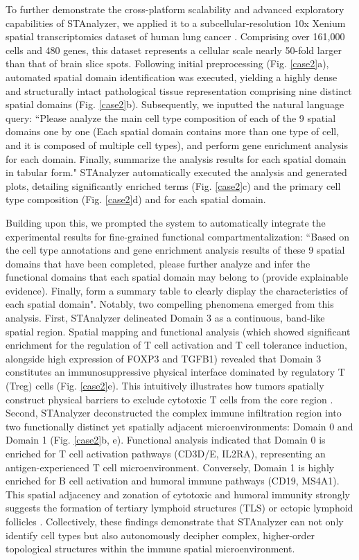 \documentclass[11pt,a4paper]{article}
\begin{document}
To further demonstrate the cross-platform scalability and advanced exploratory capabilities of STAnalyzer, we applied it to a subcellular-resolution 10x Xenium spatial transcriptomics dataset of human lung cancer \cite{janesick2023high,blampey2025novae}. Comprising over 161,000 cells and 480 genes, this dataset represents a cellular scale nearly 50-fold larger than that of brain slice spots. Following initial preprocessing (Fig. \ref{case2}a), automated spatial domain identification was executed, yielding a highly dense and structurally intact pathological tissue representation comprising nine distinct spatial domains (Fig. \ref{case2}b). Subsequently, we inputted the natural language query: ``Please analyze the main cell type composition of each of the 9 spatial domains one by one (Each spatial domain contains more than one type of cell, and it is composed of multiple cell types), and perform gene enrichment analysis for each domain. Finally, summarize the analysis results for each spatial domain in tabular form." STAnalyzer automatically executed the analysis and generated plots, detailing significantly enriched terms (Fig. \ref{case2}c) and the primary cell type composition (Fig. \ref{case2}d) and for each spatial domain.

Building upon this, we prompted the system to automatically integrate the experimental results for fine-grained functional compartmentalization: ``Based on the cell type annotations and gene enrichment analysis results of these 9 spatial domains that have been completed, please further analyze and infer the functional domains that each spatial domain may belong to (provide explainable evidence). Finally, form a summary table to clearly display the characteristics of each spatial domain". Notably, two compelling phenomena emerged from this analysis. First, STAnalyzer delineated Domain 3 as a continuous, band-like spatial region. Spatial mapping and functional analysis (which showed significant enrichment for the regulation of T cell activation and T cell tolerance induction, alongside high expression of FOXP3 and TGFB1) revealed that Domain 3 constitutes an immunosuppressive physical interface dominated by regulatory T (Treg) cells (Fig. \ref{case2}e). This intuitively illustrates how tumors spatially construct physical barriers to exclude cytotoxic T cells from the core region \cite{joyce2015t,schurch2020coordinated}. Second, STAnalyzer deconstructed the complex immune infiltration region into two functionally distinct yet spatially adjacent microenvironments: Domain 0 and Domain 1 (Fig. \ref{case2}b, e). Functional analysis indicated that Domain 0 is enriched for T cell activation pathways (CD3D/E, IL2RA), representing an antigen-experienced T cell microenvironment. Conversely, Domain 1 is highly enriched for B cell activation and humoral immune pathways (CD19, MS4A1). This spatial adjacency and zonation of cytotoxic and humoral immunity strongly suggests the formation of tertiary lymphoid structures (TLS) or ectopic lymphoid follicles \cite{sautes2019tertiary}. Collectively, these findings demonstrate that STAnalyzer can not only identify cell types but also autonomously decipher complex, higher-order topological structures within the immune spatial microenvironment.
\end{document}
